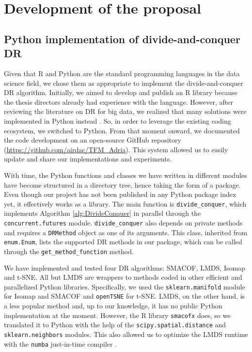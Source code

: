 \section{Development of the proposal}

\subsection{Python implementation of divide-and-conquer DR}

Given that R and Python are the standard programming languages in the data science field, we chose them as appropriate to implement the divide-and-conquer  DR algorithm. Initially, we aimed to develop and publish an R library because the thesis directors already had experience with the language. However, after reviewing the literature on DR for big data, we realized that many solutions were implemented in Python instead \citep{Reichmann2024}. So, in order to leverage the existing coding ecosystem, we switched to Python. From that moment onward, we documented the code development on an open-source GitHub repository (\href{https://github.com/airdac/TFM_Adria}{https://github.com/airdac/TFM\_Adria}). This system allowed us to easily update and share our implementations and experiments.

With time, the Python functions and classes we have written in different modules have become structured in a directory tree, hence taking the form of a package. Even though our project has not been published in any Python package index yet, it effectively works as a library. The main function is \verb|divide_conquer|, which implements Algorithm \ref{alg:DivideConquer} in parallel through the \verb|concurrent.futures| module. \verb|divide_conquer| also depends on private methods and requires a \verb|DRMethod| object as one of its arguments. This class, inherited from \verb|enum.Enum|, lists the supported DR methods in our package, which can be called through the \verb|get_method_function| method.

We have implemented and tested four DR algorithms: SMACOF, LMDS, Isomap and t-SNE. All but LMDS are wrappers to methods coded in other efficient and parallelized Python libraries. Specifically, we used the \verb|sklearn.manifold| module \citep{Pedregosa2011} for Isomap and SMACOF and \verb|openTSNE| \citep{Poličar2023} for t-SNE. LMDS, on the other hand, is a less popular method and, up to our knowledge, it has no public Python implementation at the moment. However, the R library \verb|smacofx| \citep{Leeuw2009} does, so we translated it to Python with the help of the \verb|scipy.spatial.distance| and \verb|sklearn.neighbors| modules. This also allowed us to optimize the LMDS runtime with the \verb|numba| just-in-time compiler \citep{Lam2015, Aycock2003}.

